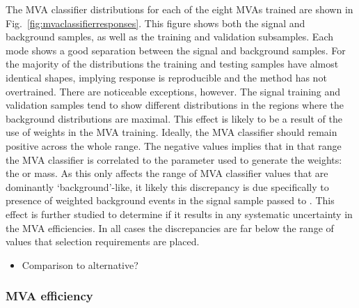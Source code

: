 The MVA classifier distributions for each of the eight MVAs trained are shown in Fig.~\ref{fig:mvaclassifierresponses}. This figure shows both the signal and background samples, as well as the training and validation subsamples. Each mode shows a good separation between the signal and background samples. For the majority of the distributions the training and testing samples have almost identical shapes, implying response is reproducible and the method has not overtrained. There are noticeable exceptions, however. The signal training and validation samples tend to show different distributions in the regions where the background distributions are maximal. This effect is likely to be a result of the use of weights in the MVA training. Ideally, the MVA classifier should remain positive across the whole range. The negative values implies that in that range the MVA classifier is correlated to the parameter used to generate the weights: the \phiz or \Dsp mass. As this only affects the range of MVA classifier values that are dominantly `background'-like, it likely this discrepancy is due specifically to presence of weighted background events in the signal sample passed to \tmva.
This effect is further studied to determine if it results in any systematic uncertainty in the MVA efficiencies. In all cases the discrepancies are far below the range of values that selection requirements are placed. 


{\color{Red}
\begin{itemize}
\item Comparison to alternative? 
\end{itemize}
}

\subsubsection{MVA efficiency}


